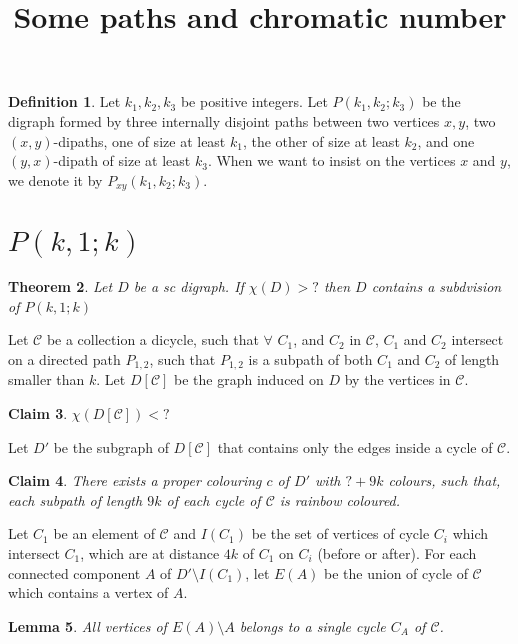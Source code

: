 \documentclass[10pt]{article}
\title{Some paths and chromatic number}
\theoremstyle{plain}
\newtheorem{theorem}{Theorem}
\newtheorem{lemma}[theorem]{Lemma}
\newtheorem{claim}[theorem]{Claim}
\theoremstyle{definition}
\newtheorem{definition}[theorem]{Definition}
\theoremstyle{remark}
\begin{document}
\begin{definition}
Let $k_1,k_2,k_3$ be positive integers. Let $P(k_1,k_2;k_3)$ be the digraph formed by three internally disjoint paths between two vertices $x,y$, two $(x,y)$-dipaths, one of size at least $k_1$, the other of size at least $k_2$, and one $(y,x)$-dipath of size at least $k_3$.
When we want to insist on the vertices $x$ and $y$, we denote it by $P_{xy}(k_1,k_2;k_3)$.
\end{definition}




\section{$P(k,1;k)$}

\begin{theorem}
Let $D$ be a sc digraph. If $\chi(D) > ?$ then $D$ contains a subdvision of $P(k,1;k)$
\end{theorem}

Let $\mathcal{C}$ be a collection a dicycle, such that $\forall$ $C_1$, and $C_2$ in $\mathcal{C}$, $C_1$ and $C_2$ intersect on 
a directed path $P_{1,2}$, such that $P_{1,2}$ is a subpath of both $C_1$ and $C_2$ of length smaller than $k$.
Let $D[\mathcal{C}]$ be the graph induced on $D$ by the vertices in $\mathcal{C}$.

\begin{claim}\label{DC}
$\chi(D[\mathcal{C}]) < ? $
\end{claim}

Let $D'$ be the subgraph of $D[\mathcal{C}]$ that contains only the edges inside a cycle of  $\mathcal{C}$.


\begin{claim}
There exists a proper colouring $c$ of $D'$ with $? + 9k$ colours, such that, each subpath of length $9k$ of each cycle of $\mathcal{C}$ is rainbow coloured. 
\end{claim}

Let $C_1$ be an element of $\mathcal{C}$ and $I(C_1)$ be the set of vertices of cycle $C_i$ which intersect $C_1$, which are at distance $4k$ 
of $C_1$ on $C_i$ (before or after). For each connected component $A$ 
of $D'\setminus I(C_1)$, let $E(A)$ be the union of cycle of $\mathcal{C}$ which contains a vertex of $A$. 


\begin{lemma}\label{A}
All vertices of $E(A) \setminus A$ belongs to a single cycle $C_A$ of $\mathcal{C}$.
\end{lemma}
\end{document}
